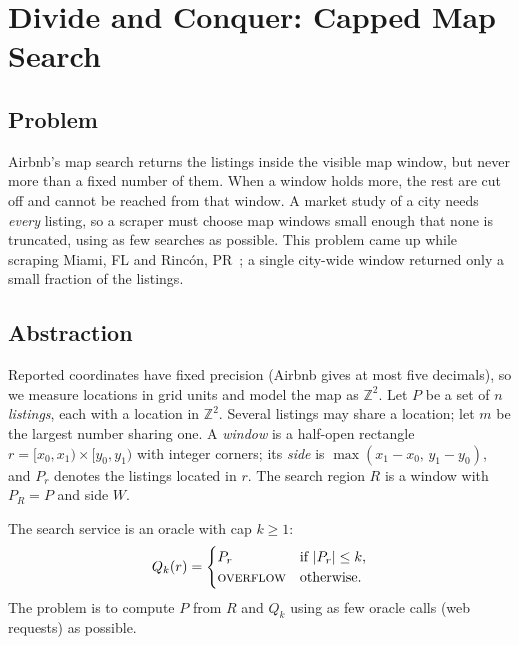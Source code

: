 
\section{Divide and Conquer: Capped Map Search}
\label{sec:dc}

\subsection{Problem}
\label{sec:dc-problem}

Airbnb's map search returns the listings inside the visible map window, but
never more than a fixed number of them. When a window holds more, the rest
are cut off and cannot be reached from that window. A market study of a city needs \emph{every} listing, so a scraper
must choose map windows small enough that none is truncated, using as few
searches as possible. This problem came up while scraping Miami, FL and
Rinc\'on, PR~\cite{danial2023airbnb}; a single city-wide window returned only a
small fraction of the listings.

\subsection{Abstraction}
\label{sec:dc-abstraction}

Reported coordinates have fixed precision (Airbnb gives at most five
decimals), so we measure locations in grid units and model the map as
$\mathbb{Z}^2$. Let $P$ be a set of $n$ \emph{listings}, each with a location
in $\mathbb{Z}^2$. Several listings may share a location; let $m$ be the
largest number sharing one. A \emph{window} is a half-open rectangle
$r=[x_0,x_1)\times[y_0,y_1)$ with integer corners; its \emph{side} is
$\max(x_1-x_0,\,y_1-y_0)$, and $P_r$ denotes the listings located in $r$. The
search region $R$ is a window with $P_R=P$ and side $W$.

The search service is an oracle with cap $k\ge1$:
\begin{equation}
Q_k(r)=\begin{cases}
P_r & \text{if } |P_r|\le k,\\
\textsc{overflow} & \text{otherwise.}
\end{cases}
\label{eq:oracle}
\end{equation}
The problem is to compute $P$ from $R$ and $Q_k$ using as few oracle calls
(web requests) as possible.

